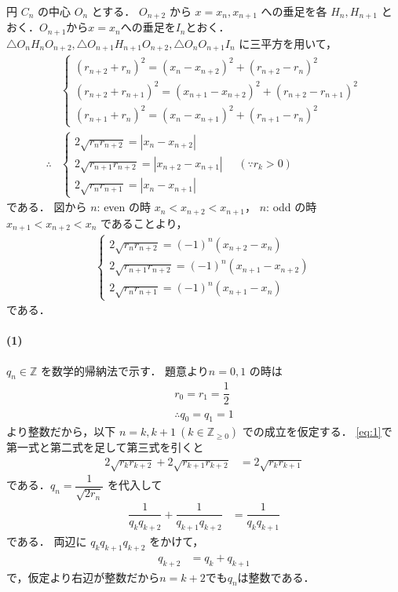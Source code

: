 \documentclass[../../main.tex]{subfiles}
\begin{document}
円 $C_n$ の中心 $O_n$ とする． $O_{n+2}$ から $x = x_n, x_{n+1}$ への垂足を各 $H_n, H_{n+1}$ とおく．$O_{n+1}$から$x=x_n$への垂足を$I_{n}$とおく．
$\triangle O_n H_n O_{n+2}, \triangle O_{n+1} H_{n+1} O_{n+2}, \triangle O_nO_{n+1}I_{n}$ に三平方を用いて，
\begin{align}
  &
  \begin{cases}
    (r_{n+2} + r_n)^2     = (x_n - x_{n+2})^2 + (r_{n+2} - r_n)^2 \\
    (r_{n+2} + r_{n+1})^2 = (x_{n+1} - x_{n+2})^2 + (r_{n+2} - r_{n+1})^2 \\
    (r_{n+1} + r_{n})^2   = (x_{n}-x_{n+1})^2 + (r_{n+1}-r_{n})^2
  \end{cases} \\
  \therefore
  &
  \begin{cases}
    2\sqrt{r_n r_{n+2}}     = |x_n - x_{n+2}| \\
    2\sqrt{r_{n+1} r_{n+2}} = |x_{n+2} - x_{n+1}| \\
    2\sqrt{r_n r_{n+1}}     = |x_{n}-x_{n+1}|
  \end{cases}
  \quad (\because r_k > 0)
\end{align}
である．
図から $n$: even の時 $x_n < x_{n+2} < x_{n+1}$， $n$: odd の時 $x_{n+1} < x_{n+2} < x_n$ であることより，
\begin{align}
  \begin{cases}
    2\sqrt{r_n r_{n+2}}     = (-1)^n (x_{n+2} - x_n) \\
    2\sqrt{r_{n+1} r_{n+2}} = (-1)^n (x_{n+1} - x_{n+2}) \\
    2\sqrt{r_n r_{n+1}}     = (-1)^n (x_{n+1} - x_n)
  \end{cases} \label{eq:1}
\end{align}
である．

\paragraph{(1)}

$q_n \in \mathbb{Z}$ を数学的帰納法で示す．
題意より$n=0, 1$ の時は
\begin{align}
  r_0 = r_1 = \dfrac{1}{2} \\
  \therefore
  q_0 = q_1 = 1 \label{eq:2}
\end{align}
より整数だから，以下 $n=k, k+1 \ (k \in \mathbb{Z}_{\ge 0})$ での成立を仮定する．
\cref{eq:1}で第一式と第二式を足して第三式を引くと
\begin{align}
  2\sqrt{r_k r_{k+2}} + 2\sqrt{r_{k+1} r_{k+2}} &= 2\sqrt{r_k r_{k+1}}
\end{align}
である．$q_n = \dfrac{1}{\sqrt{2r_n}}$ を代入して
\begin{align}
  \dfrac{1}{q_k q_{k+2}} + \dfrac{1}{q_{k+1} q_{k+2}} &= \dfrac{1}{q_k q_{k+1}}
\end{align}
である．
両辺に $q_k q_{k+1} q_{k+2}$ をかけて，
\begin{align}
  q_{k+2} &= q_k + q_{k+1} \label{eq:3}
\end{align}
で，仮定より右辺が整数だから$n=k+2$でも$q_n$は整数である．
\end{document}
